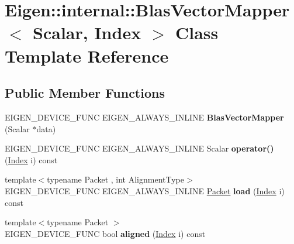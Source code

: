 \hypertarget{class_eigen_1_1internal_1_1_blas_vector_mapper}{}\section{Eigen\+:\+:internal\+:\+:Blas\+Vector\+Mapper$<$ Scalar, Index $>$ Class Template Reference}
\label{class_eigen_1_1internal_1_1_blas_vector_mapper}
\subsection*{Public Member Functions}
\begin{DoxyCompactItemize}
\item 
\mbox{\label{class_eigen_1_1internal_1_1_blas_vector_mapper_af960b8e257c177df77229dfdb693ce11}} 
E\+I\+G\+E\+N\+\_\+\+D\+E\+V\+I\+C\+E\+\_\+\+F\+U\+NC E\+I\+G\+E\+N\+\_\+\+A\+L\+W\+A\+Y\+S\+\_\+\+I\+N\+L\+I\+NE {\bfseries Blas\+Vector\+Mapper} (Scalar $\ast$data)
\item 
\mbox{\label{class_eigen_1_1internal_1_1_blas_vector_mapper_aad255f311f5104bb1ab25555b5064053}} 
E\+I\+G\+E\+N\+\_\+\+D\+E\+V\+I\+C\+E\+\_\+\+F\+U\+NC E\+I\+G\+E\+N\+\_\+\+A\+L\+W\+A\+Y\+S\+\_\+\+I\+N\+L\+I\+NE Scalar {\bfseries operator()} (\hyperlink{namespace_eigen_a62e77e0933482dafde8fe197d9a2cfde}{Index} i) const
\item 
\mbox{\label{class_eigen_1_1internal_1_1_blas_vector_mapper_a2a6098ea0c20a5f32b672b713819175c}} 
{\footnotesize template$<$typename Packet , int Alignment\+Type$>$ }\\E\+I\+G\+E\+N\+\_\+\+D\+E\+V\+I\+C\+E\+\_\+\+F\+U\+NC E\+I\+G\+E\+N\+\_\+\+A\+L\+W\+A\+Y\+S\+\_\+\+I\+N\+L\+I\+NE \hyperlink{union_eigen_1_1internal_1_1_packet}{Packet} {\bfseries load} (\hyperlink{namespace_eigen_a62e77e0933482dafde8fe197d9a2cfde}{Index} i) const
\item 
\mbox{\label{class_eigen_1_1internal_1_1_blas_vector_mapper_ab5c476e3545d42b5be634611a2a7523a}} 
{\footnotesize template$<$typename Packet $>$ }\\E\+I\+G\+E\+N\+\_\+\+D\+E\+V\+I\+C\+E\+\_\+\+F\+U\+NC bool {\bfseries aligned} (\hyperlink{namespace_eigen_a62e77e0933482dafde8fe197d9a2cfde}{Index} i) const

\end{DoxyCompactItemize}
